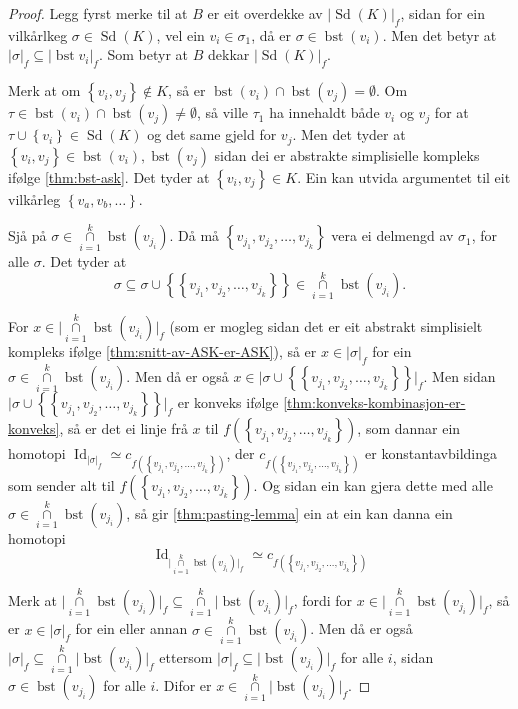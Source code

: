 \documentclass[a4paper, 12pt, norsk]{article}
\theoremstyle{plain}
\theoremstyle{definition}
\newcommand{\intersect}{ \mathop{\cap}\limits }
\newcommand{\union}{ \mathop{\cup}\limits }
\newcommand{\gr}[1]{ \lvert #1 \rvert } %
\newcommand{\set}[1]{ \left\{ #1 \right\} } %
\DeclareMathOperator{\Sd}{Sd} %
\DeclareMathOperator{\bst}{bst} %
\DeclareMathOperator{\Id}{Id} %
\begin{document}
\begin{proof}
	Legg fyrst merke til at \( B \) er eit overdekke av \( \gr{\Sd(K)}_f \), sidan for ein vilkårlkeg \( \sigma \in \Sd(K) \), vel ein \( v_i \in \sigma_1 \), då er \( \sigma \in \bst(v_i) \). Men det betyr at \( \gr{\sigma}_f \subseteq \gr{\bst{v_i}}_f \). Som betyr at \( B \) dekkar \( \gr{\Sd(K)}_f \).

	Merk at om \( \set{v_i, v_j} \not\in K \), så er \( \bst(v_i) \intersect \bst(v_j) = \emptyset \). Om \( \tau \in \bst(v_i) \intersect \bst(v_j) \neq \emptyset \), så ville \( \tau_1 \) ha innehaldt både \( v_i \) og \( v_j \) for at \( \tau \union \set{v_i} \in \Sd(K) \) og det same gjeld for \( v_j \). Men det tyder at \( \set{v_i, v_j} \in \bst(v_i), \bst(v_j) \) sidan dei er abstrakte simplisielle kompleks ifølge \autoref{thm:bst-ask}. Det tyder at \( \set{v_i, v_j} \in K \). Ein kan utvida argumentet til eit vilkårleg \( \set{v_a, v_b, \dots} \).

	Sjå på \( \sigma \in \intersect_{i = 1}^k \bst(v_{j_i}) \). Då må \( \set{v_{j_1}, v_{j_2}, \dots, v_{j_k}} \) vera ei delmengd av \( \sigma_1 \), for alle \( \sigma \). Det tyder at 
	\[ 
		\sigma \subseteq \sigma \union \set{\set{v_{j_1}, v_{j_2}, \dots, v_{j_k}}} \in \intersect_{i = 1}^k \bst(v_{j_i}).
	\]

	For \(x \in \gr{\intersect_{i = 1}^k \bst(v_{j_i})}_f \) (som er mogleg sidan det er eit abstrakt simplisielt kompleks ifølge \autoref{thm:snitt-av-ASK-er-ASK}), så er \( x \in \gr{\sigma}_f \) for ein \( \sigma \in \intersect_{i = 1}^k \bst(v_{j_i}) \). Men då er også \( x \in \gr{\sigma \union \set{\set{v_{j_1}, v_{j_2}, \dots, v_{j_k}}}}_f \). Men sidan \( \gr{\sigma \union \set{\set{v_{j_1}, v_{j_2}, \dots, v_{j_k}}}}_f \) er konveks ifølge \autoref{thm:konveks-kombinasjon-er-konveks}, så er det ei linje frå \( x \) til \( f(\set{v_{j_1}, v_{j_2}, \dots, v_{j_k}}) \), som dannar ein homotopi \( \Id_{\gr{\sigma}_f} \simeq c_{f(\set{v_{j_1}, v_{j_2}, \dots, v_{j_k}})} \), der \( c_{f(\set{v_{j_1}, v_{j_2}, \dots, v_{j_k}})} \) er konstantavbildinga som sender alt til \( f(\set{v_{j_1}, v_{j_2}, \dots, v_{j_k}}) \). Og sidan ein kan gjera dette med alle \( \sigma \in \intersect_{i = 1}^k \bst(v_{j_i}) \), så gir \autoref{thm:pasting-lemma} ein at ein kan danna ein homotopi
	\[ 
		\Id_{\gr{\intersect_{i = 1}^k \bst(v_{j_i})}_f} \simeq c_{f(\set{v_{j_1}, v_{j_2}, \dots, v_{j_k}})}
	\]

	Merk at \( \gr{\intersect_{i = 1}^k \bst(v_{j_i})}_f \subseteq \intersect_{i = 1}^k \gr{\bst(v_{j_i})}_f\), fordi for \( x \in \gr{\intersect_{i = 1}^k \bst(v_{j_i})}_f \), så er \( x \in \gr{\sigma}_f \) for ein eller annan \( \sigma \in \intersect_{i = 1}^k \bst(v_{j_i}) \). Men då er også \( \gr{\sigma}_f \subseteq \intersect_{i = 1}^k \gr{\bst(v_{j_i})}_f \) ettersom \( \gr{\sigma}_f \subseteq \gr{\bst(v_{j_i})}_f \) for alle \( i \), sidan \( \sigma \in \bst(v_{j_i}) \) for alle \( i \). Difor er \( x \in \intersect_{i = 1}^k \gr{\bst(v_{j_i})}_f \).


\end{proof}
\end{document}
